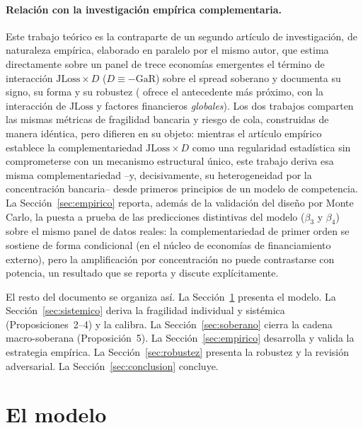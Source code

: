 \documentclass[11pt]{article}
\theoremstyle{plain}
\theoremstyle{definition}
\theoremstyle{remark}
\newcommand{\JLoss}{\mathrm{JLoss}}
\newcommand{\GaR}{\mathrm{GaR}}
\newcommand{\1}{\mathbf{1}}
\begin{document}
\paragraph{Relación con la investigación empírica complementaria.} Este trabajo teórico es la contraparte de un segundo artículo de investigación, de naturaleza empírica, elaborado en paralelo por el mismo autor, que estima directamente sobre un panel de trece economías emergentes el término de interacción $\JLoss\times D$ ($D\equiv-\GaR$) sobre el spread soberano y documenta su signo, su forma y su robustez (\citealp{Chari2024} ofrece el antecedente más próximo, con la interacción de $\JLoss$ y factores financieros \emph{globales}). Los dos trabajos comparten las mismas métricas de fragilidad bancaria y riesgo de cola, construidas de manera idéntica, pero difieren en su objeto: mientras el artículo empírico establece la complementariedad $\JLoss\times D$ como una regularidad estadística sin comprometerse con un mecanismo estructural único, este trabajo deriva esa misma complementariedad --y, decisivamente, su heterogeneidad por la concentración bancaria-- desde primeros principios de un modelo de competencia. La Sección~\ref{sec:empirico} reporta, además de la validación del diseño por Monte Carlo, la puesta a prueba de las predicciones distintivas del modelo ($\beta_3$ y $\beta_4$) sobre el mismo panel de datos reales: la complementariedad de primer orden se sostiene de forma condicional (en el núcleo de economías de financiamiento externo), pero la amplificación por concentración no puede contrastarse con potencia, un resultado que se reporta y discute explícitamente.

El resto del documento se organiza así. La Sección~\ref{sec:modelo} presenta el modelo. La Sección~\ref{sec:sistemico} deriva la fragilidad individual y sistémica (Proposiciones~2--4) y la calibra. La Sección~\ref{sec:soberano} cierra la cadena macro-soberana (Proposición~5). La Sección~\ref{sec:empirico} desarrolla y valida la estrategia empírica. La Sección~\ref{sec:robustez} presenta la robustez y la revisión adversarial. La Sección~\ref{sec:conclusion} concluye.

\section{El modelo}\label{sec:modelo}
\end{document}
